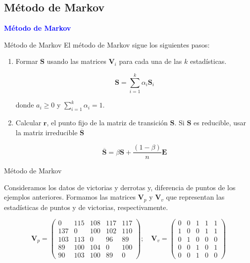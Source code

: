 \documentclass[10pt]{beamer}
\begin{document}
	\subsection{Método de Markov}
	
	\begin{frame}
		\begin{center}
			\Huge\textbf{\textsf{\textcolor{blue}{Método de Markov}}}
		\end{center}
	\end{frame}
	
	\begin{frame}{Método de Markov}
		El método de Markov sigue los siguientes pasos:
		
		\begin{enumerate}
			\item Formar $\mathbf{S}$ usando las matrices $\mathbf{V}_i$ para cada una de las $k$ estadísticas.
			
			\[ \mathbf{S} = \sum_{i=1}^{k} \alpha_i \mathbf{S}_i \]
			
			donde $a_i \geq 0$ y $\sum_{i=1}^{k} \alpha_i = 1$.
			
			\item Calcular $\mathbf{r}$, el punto fijo de la matriz de transición $\mathbf{S}$. Si $\mathbf{S}$ es reducible, usar la matriz irreducible $\overline{\mathbf{S}}$
			
			\[\overline{\mathbf{S}} = \beta \mathbf{S} + \dfrac{(1 - \beta)}{n} \mathbf{E}\]
		\end{enumerate}
	\end{frame}
	
	\begin{frame}{Método de Markov}
		\begin{ejemplo}
			Consideramos los datos de victorias y derrotas y, diferencia de puntos de los ejemplos anteriores. Formamos las matrices $\mathbf{V}_p$ y $\mathbf{V}_v$ que representan las estadísticas de puntos y de victorias, respectivamente.
			
			\[ \mathbf{V}_p = \left(\begin{array}{rrrrr}
			0   & 115 & 108 & 117 & 117\\
			137 & 0   & 100 & 102 & 110\\
			103 & 113 & 0   & 96  & 89 \\
			89  & 100 & 104 & 0   & 100\\
			90  & 103 & 100 & 89  & 0
			\end{array}\right); \quad 
			\mathbf{V}_v = \left(\begin{array}{rrrrr}
			0 & 0 & 1 & 1 & 1\\
			1 & 0 & 0 & 1 & 1\\
			0 & 1 & 0 & 0 & 0\\
			0 & 0 & 1 & 0 & 1\\
			0 & 0 & 1 & 0 & 0
			\end{array}\right) \]
		\end{ejemplo}
	\end{frame}
	
\end{document}
